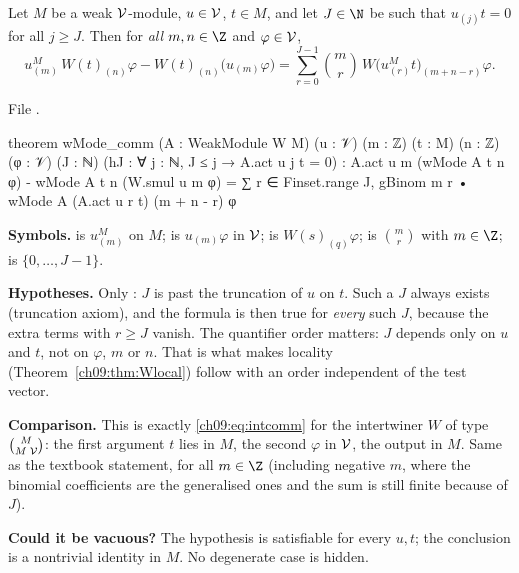 \begin{theorem}\label{ch09:thm:Wcomm}
Let $M$ be a weak $\mathcal{V}$-module, $u\in\mathcal{V}$, $t\in M$, and let $J\in\N$ be such that
$u_{(j)}t=0$ for all $j\ge J$. Then for \emph{all} $m,n\in\Z$ and $\varphi\in\mathcal{V}$,
\begin{equation}\label{ch09:eq:Wcomm}
u^M_{(m)}\,W(t)_{(n)}\varphi-W(t)_{(n)}\big(u_{(m)}\varphi\big)
=\sum_{r=0}^{J-1}\binom{m}{r}\,W\big(u^M_{(r)}t\big)_{(m+n-r)}\varphi .
\end{equation}
\end{theorem}
\noindent File .
\begin{leancode}
theorem wMode_comm (A : WeakModule W M) (u : 𝒱) (m : ℤ) (t : M) (n : ℤ) (φ : 𝒱) (J : ℕ)
    (hJ : ∀ j : ℕ, J ≤ j → A.act u j t = 0) :
    A.act u m (wMode A t n φ) - wMode A t n (W.smul u m φ)
      = ∑ r ∈ Finset.range J, gBinom m r • wMode A (A.act u r t) (m + n - r) φ
\end{leancode}

\begin{dictionary}
\textbf{Symbols.}  is $u^M_{(m)}$ on $M$;  is $u_{(m)}\varphi$
in $\mathcal{V}$;  is $W(s)_{(q)}\varphi$;  is $\binom{m}{r}$
with $m\in\Z$;  is $\{0,\dots,J-1\}$.

\textbf{Hypotheses.} Only : $J$ is past the truncation of $u$ on $t$. Such a $J$ always
exists (truncation axiom), and the formula is then true for \emph{every} such $J$, because the
extra terms with $r\ge J$ vanish. The quantifier order matters: $J$ depends only on $u$ and $t$,
not on $\varphi$, $m$ or $n$. That is what makes locality (Theorem~\ref{ch09:thm:Wlocal}) follow
with an order independent of the test vector.

\textbf{Comparison.} This is exactly \eqref{ch09:eq:intcomm} for the intertwiner $W$ of type
$\binom{M}{M\;\mathcal{V}}$: the first argument $t$ lies in $M$, the second $\varphi$ in
$\mathcal{V}$, the output in $M$. Same as the textbook statement, for all $m\in\Z$ (including
negative $m$, where the binomial coefficients are the generalised ones and the sum is still
finite because of $J$).

\textbf{Could it be vacuous?} The hypothesis is satisfiable for every $u,t$; the conclusion is a
nontrivial identity in $M$. No degenerate case is hidden.
\end{dictionary}

